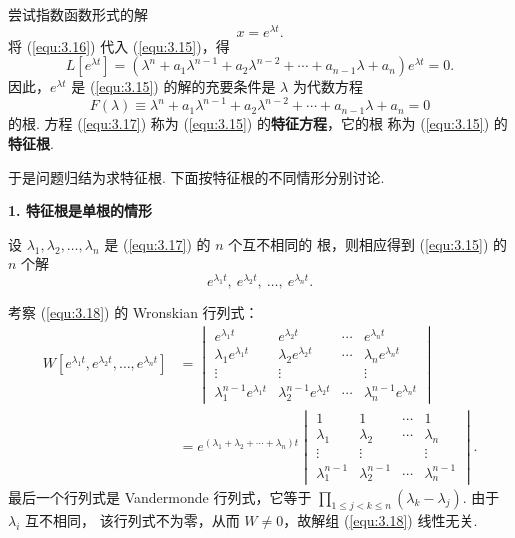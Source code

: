 尝试指数函数形式的解
\begin{equation}\label{equ:3.16}
x=e^{\lambda t}.
\end{equation}
将 (\ref{equ:3.16}) 代入 (\ref{equ:3.15})，得
\[
L[e^{\lambda t}]=\left(\lambda^n+a_1\lambda^{n-1}
+a_2\lambda^{n-2}+\cdots+a_{n-1}\lambda+a_n\right)e^{\lambda t}=0.
\]
因此，$e^{\lambda t}$ 是 (\ref{equ:3.15}) 的解的充要条件是 $\lambda$ 为代数方程
\begin{equation}\label{equ:3.17}
F(\lambda)\equiv\lambda^n+a_1\lambda^{n-1}
+a_2\lambda^{n-2}+\cdots+a_{n-1}\lambda+a_n=0
\end{equation}
的根. 方程 (\ref{equ:3.17}) 称为 (\ref{equ:3.15}) 的\textbf{特征方程}，它的根
称为 (\ref{equ:3.15}) 的\textbf{特征根}.

于是问题归结为求特征根. 下面按特征根的不同情形分别讨论.

\textbf{1. 特征根是单根的情形}

设 $\lambda_1,\lambda_2,\dots,\lambda_n$ 是 (\ref{equ:3.17}) 的 $n$ 个互不相同的
根，则相应得到 (\ref{equ:3.15}) 的 $n$ 个解
\begin{equation}\label{equ:3.18}
e^{\lambda_1t},\ e^{\lambda_2t},\ \dots,\ e^{\lambda_nt}.
\end{equation}

\begin{pf1}
考察 (\ref{equ:3.18}) 的 Wronskian 行列式：
\[
\begin{aligned}
W\left[e^{\lambda_1t},e^{\lambda_2t},\dots,e^{\lambda_nt}\right]
&=
\begin{vmatrix}
e^{\lambda_1t} & e^{\lambda_2t} & \cdots & e^{\lambda_nt}\\
\lambda_1e^{\lambda_1t} & \lambda_2e^{\lambda_2t} & \cdots
& \lambda_ne^{\lambda_nt}\\
\vdots & \vdots & & \vdots\\
\lambda_1^{n-1}e^{\lambda_1t} & \lambda_2^{n-1}e^{\lambda_2t} & \cdots
& \lambda_n^{n-1}e^{\lambda_nt}
\end{vmatrix}\\
&=e^{(\lambda_1+\lambda_2+\cdots+\lambda_n)t}
\begin{vmatrix}
1 & 1 & \cdots & 1\\
\lambda_1 & \lambda_2 & \cdots & \lambda_n\\
\vdots & \vdots & & \vdots\\
\lambda_1^{n-1} & \lambda_2^{n-1} & \cdots & \lambda_n^{n-1}
\end{vmatrix}.
\end{aligned}
\]
最后一个行列式是 Vandermonde 行列式，它等于
$\prod\limits_{1\le j<k\le n}(\lambda_k-\lambda_j)$. 由于 $\lambda_i$ 互不相同，
该行列式不为零，从而 $W\neq0$，故解组 (\ref{equ:3.18}) 线性无关.
\end{pf1}

